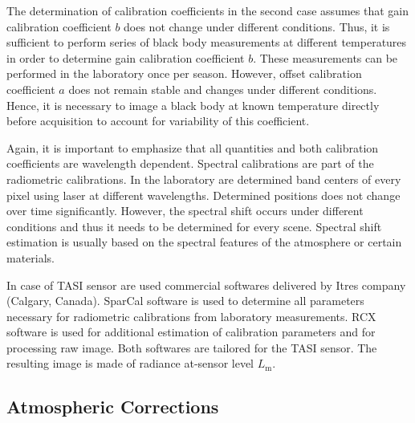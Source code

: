 The determination of calibration coefficients in the second case assumes that gain calibration coefficient $b$ does not change under different conditions. Thus, it is sufficient to perform series of black body measurements at different temperatures in order to determine gain calibration coefficient $b$. These measurements can be performed in the laboratory once per season. However, offset calibration coefficient $a$ does not remain stable and changes under different conditions. Hence, it is necessary to image a black body at known temperature directly before acquisition to account for variability of this coefficient.


Again, it is important to emphasize that all quantities and both calibration coefficients are wavelength dependent. Spectral calibrations are part of the radiometric calibrations. In the laboratory are determined band centers of every pixel using laser at different wavelengths. Determined positions does not change over time significantly. However, the spectral shift occurs under different conditions and thus it needs to be determined for every scene. Spectral shift estimation is usually based on the spectral features of the atmosphere or certain materials.

In case of TASI sensor are used commercial softwares delivered by Itres company (Calgary, Canada). SparCal software \cite{software:SparCal} is used to determine all parameters necessary for radiometric calibrations from laboratory measurements. RCX software \cite{software:RCX} is used for additional  estimation of calibration parameters and for processing raw image. Both softwares are tailored for the TASI sensor. The resulting image is made of radiance at-sensor level $L_\mathrm{m}$.

\subsection{Atmospheric Corrections}

